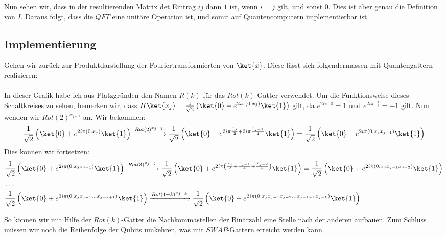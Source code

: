 Nun sehen wir, dass in der resultierenden Matrix det Eintrag $ij$ dann $1$ ist, wenn $i = j$ gilt, und sonst $0$. Dies ist aber genau die Definition von $I$. Daraus folgt, dass die $QFT$ eine unitäre Operation ist, und somit auf Quantencomputern implementierbar ist.

\subsection{Implementierung}

Gehen wir zurück zur Produktdarstellung der Fouriertransformierten von $\ket{x}$. Diese lässt sich folgendermassen mit Quantengattern realisieren:
\paragraph{}
{
\scriptsize

}
\paragraph{}
In dieser Grafik habe ich aus Platzgründen den Namen $R(k)$ für das $Rot(k)$-Gatter verwendet. Um die Funktionsweise dieses Schaltkreises zu sehen, bemerken wir, dass $H\ket{x_j} = \frac{1}{\sqrt{2}}\left(\ket{0} + e^{2i\pi(0.x_j)}\ket{1}\right)$ gilt, da $e^{2i\pi\cdot 0} = 1$ und $e^{2i\pi\cdot\frac{1}{2}} = -1$ gilt. Nun wenden wir $Rot(2)^{x_{j - 1}}$ an. Wir bekommen:
$$\frac{1}{\sqrt{2}}\left(\ket{0} + e^{2i\pi(0.x_j)}\ket{1}\right) \xrightarrow{Rot(2)^{x_{j - 1}}} \frac{1}{\sqrt{2}}\left(\ket{0} + e^{2i\pi\frac{x_j}{2} + 2i\pi\frac{x_{j - 1}}{4}}\ket{1}\right) = \frac{1}{\sqrt{2}}\left(\ket{0} + e^{2i\pi(0.x_jx_{j - 1})}\ket{1}\right)$$
Dies können wir fortsetzen: 
\begin{align*}
&\frac{1}{\sqrt{2}}\left(\ket{0} + e^{2i\pi(0.x_jx_{j - 1})}\ket{1}\right) \xrightarrow{Rot(3)^{x_{j - 2}}} \frac{1}{\sqrt{2}}\left(\ket{0} + e^{2i\pi\left(\frac{x_j}{2} + \frac{x_{j - 1}}{4} + \frac{x_{j - 2}}{8}\right)}\ket{1}\right) = \frac{1}{\sqrt{2}}\left(\ket{0} + e^{2i\pi(0.x_jx_{j - 1}x_{j - 2})}\ket{1}\right) \\ &\dots \\ &\frac{1}{\sqrt{2}}\left(\ket{0} + e^{2i\pi(0.x_jx_{j - 1}\dots x_{j - k + 1})}\ket{1}\right) \xrightarrow{Rot(1 + k)^{x_{j - k}}} \frac{1}{\sqrt{2}}\left(\ket{0} + e^{2i\pi(0.x_jx_{j - 1}x_{j - 2}\dots x_{j - k + 1} x_{j - k})}\ket{1}\right)
\end{align*}

So können wir mit Hilfe der $Rot(k)$-Gatter die Nachkommastellen der Binärzahl eine Stelle nach der anderen aufbauen. Zum Schluss müssen wir noch die Reihenfolge der Qubits umkehren, was mit $SWAP$-Gattern erreicht werden kann.

